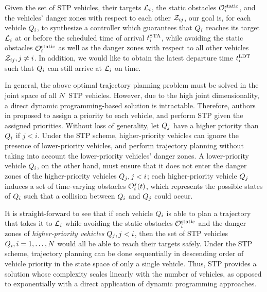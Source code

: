 Given the set of STP vehicles, their targets $\mathcal{L}_i$, the static obstacles $\mathcal{O}^\text{static}_i$, and the vehicles' danger zones with respect to each other $\mathcal{Z}_{ij}$, our goal is, for each vehicle $Q_i$, to synthesize a controller which guarantees that $Q_i$ reaches its target $\mathcal{L}_i$ at or before the scheduled time of arrival $t^\text{STA}_i$, while avoiding the static obstacles $\mathcal{O}^\text{static}_i$ as well as the danger zones with respect to all other vehicles $\mathcal{Z}_{ij}, j\neq i$. In addition, we would like to obtain the latest departure time $t^\text{LDT}_i$ such that $Q_i$ can still arrive at $\mathcal{L}_i$ on time.

In general, the above optimal trajectory planning problem must be solved in the joint space of all $N$ STP vehicles. However, due to the high joint dimensionality, a direct dynamic programming-based solution is intractable. Therefore, authors in \cite{Chen15c} proposed to assign a priority to each vehicle, and perform STP given the assigned priorities. Without loss of generality, let $Q_j$ have a higher priority than $Q_i$ if $j<i$. Under the STP scheme, higher-priority vehicles can ignore the presence of lower-priority vehicles, and perform trajectory planning without taking into account the lower-priority vehicles' danger zones. A lower-priority vehicle $Q_i$, on the other hand, must ensure that it does not enter the danger zones of the higher-priority vehicles $Q_j, j<i$; each higher-priority vehicle $Q_j$ induces a set of time-varying obstacles $\mathcal{O}_i^j(t)$, which represents the possible states of $Q_i$ such that a collision between $Q_i$ and $Q_j$ could occur.

It is straight-forward to see that if each vehicle $Q_i$ is able to plan a trajectory that takes it to $\mathcal{L}_i$ while avoiding the static obstacles $\mathcal{O}^\text{static}_i$ and the danger zones of \textit{higher-priority vehicles} $Q_j, j<i$, then the set of STP vehicles $Q_i, i=1,\ldots,N$ would all be able to reach their targets safely. Under the STP scheme, trajectory planning can be done sequentially in descending order of vehicle priority in the state space of only a single vehicle. Thus, STP provides a solution whose complexity scales linearly with the number of vehicles, as opposed to exponentially with a direct application of dynamic programming approaches. %